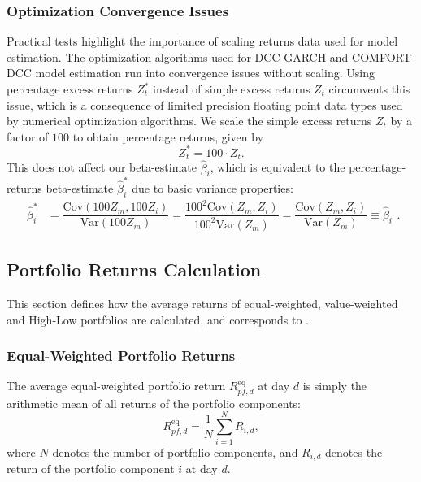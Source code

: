 \documentclass[11pt,a4paper]{article}
\begin{document}
\subsubsection{Optimization Convergence Issues}

Practical tests highlight the importance of scaling returns data used for model estimation. The optimization algorithms used for DCC-GARCH and COMFORT-DCC model estimation run into convergence issues without scaling. Using percentage excess returns $Z^*_{t}$ instead of simple excess returns $Z_t$ circumvents this issue, which is a consequence of limited precision floating point data types used by numerical optimization algorithms. We scale the simple excess returns $Z_t$ by a factor of $100$ to obtain percentage returns, given by
\begin{equation}
    Z^*_{t} = 100 \cdot Z_t.
\end{equation}
This does not affect our beta-estimate $\hat{\beta}_{i}$, which is equivalent to the percentage-returns beta-estimate $\hat{\beta}_{i}^*$ due to basic variance properties:
\begin{equation}
\begin{split}
\hat{\beta}_{i}^* & = \dfrac{ \textrm{Cov}(100 Z_m, 100 Z_i) }{ \textrm{Var}(100 Z_m) } = \dfrac{ {100^2} \textrm{Cov}(Z_m, Z_i) }{ {100^2} \textrm{Var}(Z_m) } = \dfrac{ \textrm{Cov}(Z_m, Z_i) }{ \textrm{Var}(Z_m) } \equiv \hat\beta_i
\end{split}.
\end{equation}





\subsection{Portfolio Returns Calculation} \label{section:pf_returns_calculation}

This section defines how the average returns of equal-weighted, value-weighted and High-Low portfolios are calculated, and corresponds to .


\subsubsection{Equal-Weighted Portfolio Returns}

The average equal-weighted portfolio return $R_{\textit{pf},d}^{\textrm{eq}}$ at day $d$ is simply the arithmetic mean of all returns of the portfolio components:
\begin{equation}
    R_{\textit{pf},d}^{\textrm{eq}} = \frac{1}{N} \sum\limits_{i=1}^N R_{i,d},
\end{equation}
where $N$ denotes the number of portfolio components, and $R_{i,d}$ denotes the return of the portfolio component $i$ at day $d$.
\end{document}
